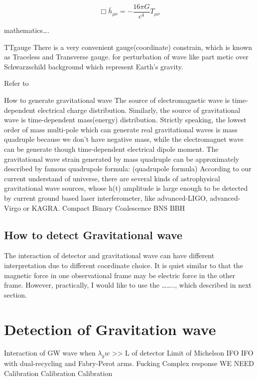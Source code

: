 \begin{equation}
    \Box \bar{h}_{\mu\nu} = - \frac{16\pi G}{c^4}T_{\mu\nu}
\end{equation}


mathematics….

TTgauge
There is a very convenient gauge(coordinate) constrain, which is known as Traceless and Transverse gauge. 
for perturbation of wave like part metic over Schwarzschild background which represent Earth’s gravity.


Refer to \cite{maggiore:gw1}



How to generate gravitational wave
The source of electromagnetic wave is time-dependent electrical charge distribution.  Similarly, the source of gravitational wave is time-dependent mass(energy) distribution. Strictly speaking, the lowest order of mass multi-pole which can generate real gravitational waves is mass quadruple because we don’t have negative mass, while the electromagnet wave can be generate though time-dependent electrical dipole moment. The gravitational wave strain generated by mass quadruple can be approximately described by famous quadrupole formula:
(quadrupole formula)
According to our current understand of universe, there are several kinds of astrophysical gravitational wave sources, whose h(t) amplitude is large enough to be detected by current ground based laser interferometer, like advanced-LIGO, advanced-Virgo or KAGRA.
Compact Binary Coalescence 
BNS BBH
\subsection{How to detect Gravitational wave}
The interaction of detector and gravitational wave can have different interpretation due to different coordinate choice. It is quiet similar to that the magnetic force in one observational frame may be electric force in the other frame. However, practically, I would like to use the …….., which described in next section.


\section{Detection of Gravitation wave}

Interaction of GW wave when $\lambda_gw$ >> L of detector
Limit of Michelson IFO
IFO with dual-recycling and Fabry-Perot  arms.
Fucking Complex response
WE NEED Calibration Calibration Calibration



